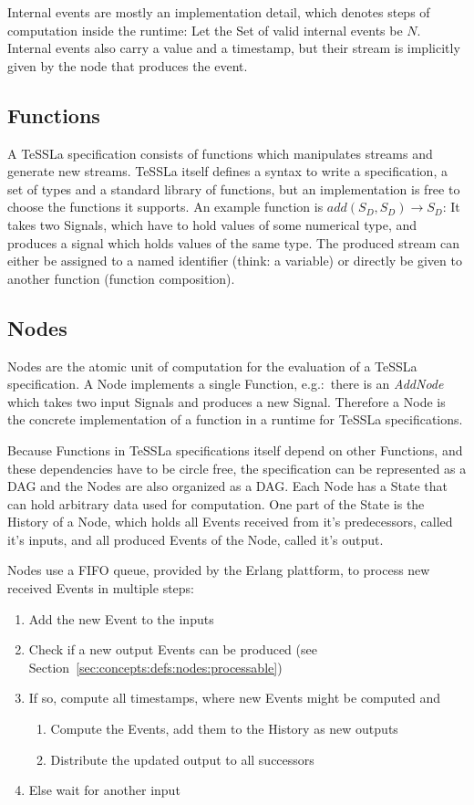 Internal events are mostly an implementation detail, which denotes steps of computation inside the runtime:
Let the Set of valid internal events be \(N\).
Internal events also carry a value and a timestamp, but their stream is implicitly given by the node that produces the event.

\subsection{Functions}
\label{sec:concepts:defs:functions}

A TeSSLa specification consists of functions which manipulates streams and generate new streams.
TeSSLa itself defines a syntax to write a specification, a set of types and a standard library of functions, but an implementation is free to choose the functions it supports.
An example function is \(add(S_D,S_D) \rightarrow S_D\): It takes two Signals, which have to hold values of some numerical type, and produces a signal which holds values of the same type.
The produced stream can either be assigned to a named identifier (think: a variable) or directly be given to another function (function composition).

\subsection{Nodes}
\label{sec:concepts:defs:nodes}

Nodes are the atomic unit of computation for the evaluation of a TeSSLa specification.
A Node implements a single Function, e.g.:\ there is an \emph{AddNode} which takes two input Signals and produces a new Signal.
Therefore a Node is the concrete implementation of a function in a runtime for TeSSLa specifications.

Because Functions in TeSSLa specifications itself depend on other Functions, and these dependencies have to be circle free,
the specification can be represented as a DAG and the Nodes are also organized as a DAG\@.
Each Node has a State that can hold arbitrary data used for computation.
One part of the State is the History of a Node, which holds all Events received from it's predecessors, called it's inputs, and all produced Events of the Node, called it's output.

Nodes use a FIFO queue, provided by the Erlang plattform, to process new received Events in multiple steps:
\begin{enumerate}
  \item Add the new Event to the inputs
  \item Check if a new output Events can be produced (see Section~\ref{sec:concepts:defs:nodes:processable})
  \item If so, compute all timestamps, where new Events might be computed and
    \begin{enumerate}
      \item Compute the Events, add them to the History as new outputs
      \item Distribute the updated output to all successors
    \end{enumerate}
  \item Else wait for another input
\end{enumerate}

